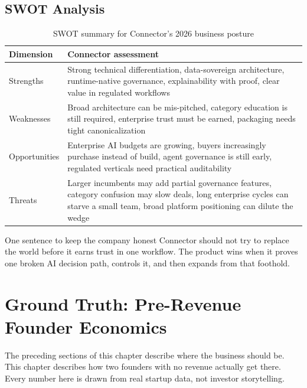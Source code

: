 \section{SWOT Analysis}

\begin{table}[H]
\centering
\renewcommand{\arraystretch}{1.45}
\begin{tabularx}{\textwidth}{@{}lX@{}}
\toprule
\textbf{Dimension} & \textbf{Connector assessment} \\
\midrule
Strengths & Strong technical differentiation, data-sovereign architecture, runtime-native governance, explainability with proof, clear value in regulated workflows \\
Weaknesses & Broad architecture can be mis-pitched, category education is still required, enterprise trust must be earned, packaging needs tight canonicalization \\
Opportunities & Enterprise AI budgets are growing, buyers increasingly purchase instead of build, agent governance is still early, regulated verticals need practical auditability \\
Threats & Larger incumbents may add partial governance features, category confusion may slow deals, long enterprise cycles can starve a small team, broad platform positioning can dilute the wedge \\
\bottomrule
\end{tabularx}
\caption{SWOT summary for Connector's 2026 business posture}
\end{table}

\begin{insightbox}{One sentence to keep the company honest}
Connector should not try to replace the world before it earns trust in one
workflow. The product wins when it proves one broken AI decision path,
controls it, and then expands from that foothold.
\end{insightbox}

\chapter*{Ground Truth: Pre-Revenue Founder Economics}

The preceding sections of this chapter describe where the business should be.
This chapter describes how two founders with no revenue actually get there.
Every number here is drawn from real startup data, not investor storytelling.

